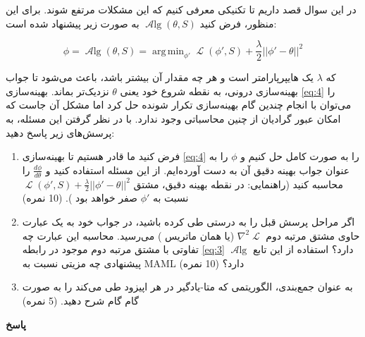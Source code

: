 \documentclass{article}
\DeclareMathOperator*{\argmin}{arg\,min}
\DeclareMathOperator{\Loss}{\mathcal{L}}
\DeclareMathOperator{\Alg}{\mathcal{A}lg}
\begin{document}
در این سوال قصد داریم تا تکنیکی معرفی کنیم که این مشکلات مرتفع شوند. برای این منظور، فرض کنید 
$\Alg(\theta, S)$
به صورت زیر پیشنهاد شده است:

\begin{equation}		\label{eq:4}
	\phi = \Alg(\theta,S) = \argmin_{\phi'} \Loss(\phi', S) + \frac{\lambda}{2}||\phi' - \theta||^2
\end{equation}
 
که $\lambda$ یک هایپرپارامتر است و هر چه مقدار آن بیشتر باشد، باعث می‌شود تا جواب بهینه‌سازی درونی، به نقطه شروع خود یعنی
$\theta$
نزدیک‌تر بماند. بهینه‌سازی \ref{eq:4}
را می‌توان با انجام چندین گام بهینه‌سازی تکرار شونده
  حل کرد اما مشکل آن جاست که امکان عبور گرادیان از چنین محاسباتی وجود ندارد. با در نظر گرفتن این مسئله، به پرسش‌های زیر پاسخ دهید:

\begin{enumerate}
\item
فرض کنید ما قادر هستیم تا بهینه‌سازی 
\ref{eq:4}
را به صورت کامل حل کنیم و 
$\phi$
را به عنوان جواب بهینه دقیق آن به دست آورده‌ایم. از این مسئله استفاده کنید و 
$\frac{d\phi}{d\theta}$
را محاسبه کنید (راهنمایی: در نقطه بهینه دقیق، مشتق 
$ \Loss(\phi', S) + \frac{\lambda}{2}||\phi' - \theta||^2$
نسبت به 
$\phi'$
صفر خواهد بود
).
(10 نمره)

\item
اگر مراحل پرسش قبل را به درستی طی کرده باشید، در جواب خود به یک عبارت حاوی مشتق مرتبه دوم $\nabla^2 \Loss$ (یا همان ماتریس 
)
می‌رسید. محاسبه این عبارت چه تفاوتی با مشتق مرتبه دوم موجود در رابطه 
\ref{eq:3}
دارد؟ استفاده از این تابع
$\Alg$
پیشنهادی چه مزیتی نسبت به MAML دارد؟
(10 نمره)

\item
به عنوان جمع‌بندی، الگوریتمی که متا-یادگیر در هر اپیزود طی می‌کند را به صورت گام گام شرح دهید.
(5 نمره)

\end{enumerate}
\iffalse
\textbf{پاسخ}
\end{document}
